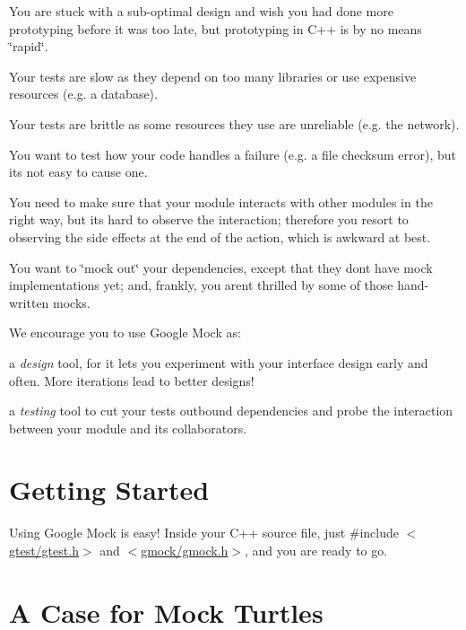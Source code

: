 \begin{DoxyItemize}
\item You are stuck with a sub-\/optimal design and wish you had done more prototyping before it was too late, but prototyping in C++ is by no means \char`\"{}rapid\char`\"{}.
\item Your tests are slow as they depend on too many libraries or use expensive resources (e.\+g. a database).
\item Your tests are brittle as some resources they use are unreliable (e.\+g. the network).
\item You want to test how your code handles a failure (e.\+g. a file checksum error), but it\textquotesingle{}s not easy to cause one.
\item You need to make sure that your module interacts with other modules in the right way, but it\textquotesingle{}s hard to observe the interaction; therefore you resort to observing the side effects at the end of the action, which is awkward at best.
\item You want to \char`\"{}mock out\char`\"{} your dependencies, except that they don\textquotesingle{}t have mock implementations yet; and, frankly, you aren\textquotesingle{}t thrilled by some of those hand-\/written mocks.
\end{DoxyItemize}

We encourage you to use Google Mock as\+:


\begin{DoxyItemize}
\item a {\itshape design} tool, for it lets you experiment with your interface design early and often. More iterations lead to better designs!
\item a {\itshape testing} tool to cut your tests\textquotesingle{} outbound dependencies and probe the interaction between your module and its collaborators.
\end{DoxyItemize}

\section*{Getting Started}

Using Google Mock is easy! Inside your C++ source file, just {\ttfamily \#include} {\ttfamily $<$\hyperlink{gtest_8h}{gtest/gtest.\+h}$>$} and {\ttfamily $<$\hyperlink{gmock_8h}{gmock/gmock.\+h}$>$}, and you are ready to go.

\section*{A Case for Mock Turtles}

